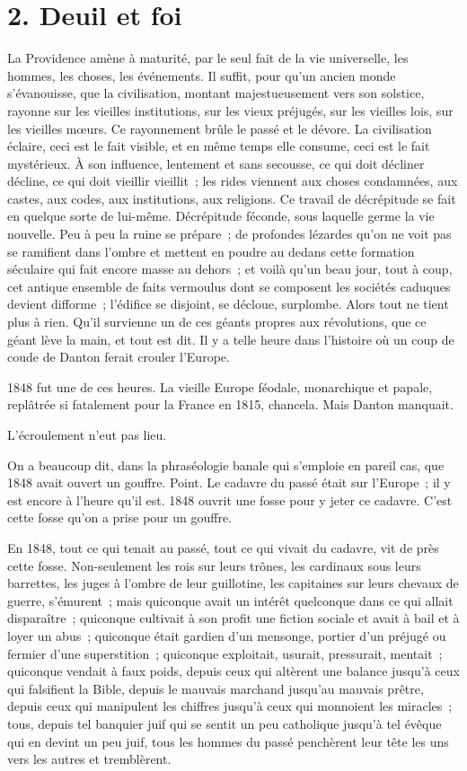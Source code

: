 \documentclass[french,twoside]{book} %
\begin{document}
\section[{2. Deuil et foi}]{2. Deuil et foi}

\noindent La Providence amène à maturité, par le seul fait de la vie universelle, les hommes, les choses, les événements. Il suffit, pour qu’un ancien monde s’évanouisse, que la civilisation, montant majestueusement vers son solstice, rayonne sur les vieilles institutions, sur les vieux préjugés, sur les vieilles lois, sur les vieilles mœurs. Ce rayonnement brûle le passé et le dévore. La civilisation éclaire, ceci est le fait visible, et en même temps elle consume, ceci est le fait mystérieux. À son influence, lentement et sans secousse, ce qui doit décliner décline, ce qui doit vieillir vieillit ; les rides viennent aux choses condamnées, aux castes, aux codes, aux institutions, aux religions. Ce travail de décrépitude se fait en quelque sorte de lui-même. Décrépitude féconde, sous laquelle germe la vie nouvelle. Peu à peu la ruine se prépare ; de profondes lézardes qu’on ne voit pas se ramifient dans l’ombre et mettent en poudre au dedans cette formation séculaire qui fait encore masse au dehors ; et voilà qu’un beau jour, tout à coup, cet antique ensemble de faits vermoulus dont se composent les sociétés caduques devient difforme ; l’édifice se disjoint, se décloue, surplombe. Alors tout ne tient plus à rien. Qu’il survienne un de ces géants propres aux révolutions, que ce géant lève la main, et tout est dit. Il y a telle heure dans l’histoire où un coup de coude de Danton ferait crouler l’Europe.\par
1848 fut une de ces heures. La vieille Europe féodale, monarchique et papale, replâtrée si fatalement pour la France en 1815, chancela. Mais Danton manquait.\par
L’écroulement n’eut pas lieu.\par
On a beaucoup dit, dans la phraséologie banale qui s’emploie en pareil cas, que 1848 avait ouvert un gouffre. Point. Le cadavre du passé était sur l’Europe ; il y est encore à l’heure qu’il est. 1848 ouvrit une fosse pour y jeter ce cadavre. C’est cette fosse qu’on a prise pour un gouffre.\par
En 1848, tout ce qui tenait au passé, tout ce qui vivait du cadavre, vit de près cette fosse. Non-seulement les rois sur leurs trônes, les cardinaux sous leurs barrettes, les juges à l’ombre de leur guillotine, les capitaines sur leurs chevaux de guerre, s’émurent ; mais quiconque avait un intérêt quelconque dans ce qui allait disparaître ; quiconque cultivait à son profit une fiction sociale et avait à bail et à loyer un abus ; quiconque était gardien d’un mensonge, portier d’un préjugé ou fermier d’une superstition ; quiconque exploitait, usurait, pressurait, mentait ; quiconque vendait à faux poids, depuis ceux qui altèrent une balance jusqu’à ceux qui falsifient la Bible, depuis le mauvais marchand jusqu’au mauvais prêtre, depuis ceux qui manipulent les chiffres jusqu’à ceux qui monnoient les miracles ; tous, depuis tel banquier juif qui se sentit un peu catholique jusqu’à tel évêque qui en devint un peu juif, tous les hommes du passé penchèrent leur tête les uns vers les autres et tremblèrent.\par
\end{document}
